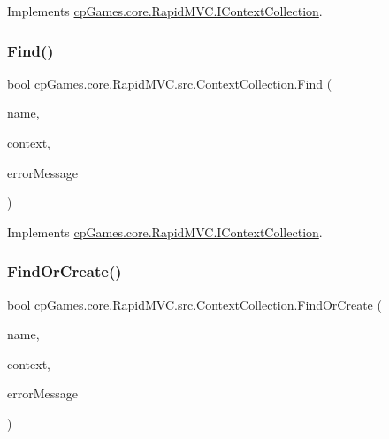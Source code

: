 Implements \mbox{\hyperlink{interfacecp_games_1_1core_1_1_rapid_m_v_c_1_1_i_context_collection_a341363d37ac179e4b157d97f6e69404f}{cp\+Games.\+core.\+Rapid\+M\+V\+C.\+I\+Context\+Collection}}.

\mbox{\label{classcp_games_1_1core_1_1_rapid_m_v_c_1_1src_1_1_context_collection_a02fb5263a77b5b36b5f3e32a98686b12}} 
\subsubsection{\texorpdfstring{Find()}{Find()}}
{\footnotesize\ttfamily bool cp\+Games.\+core.\+Rapid\+M\+V\+C.\+src.\+Context\+Collection.\+Find (\begin{DoxyParamCaption}\item[{string}]{name,  }\item[{out \mbox{\hyperlink{interfacecp_games_1_1core_1_1_rapid_m_v_c_1_1_i_context}{I\+Context}}}]{context,  }\item[{out string}]{error\+Message }\end{DoxyParamCaption})}



Implements \mbox{\hyperlink{interfacecp_games_1_1core_1_1_rapid_m_v_c_1_1_i_context_collection_a69e776a5c412ae0659e9df5e208ec374}{cp\+Games.\+core.\+Rapid\+M\+V\+C.\+I\+Context\+Collection}}.

\mbox{\label{classcp_games_1_1core_1_1_rapid_m_v_c_1_1src_1_1_context_collection_ad7d4663f1d96310bfba100e9140b11b8}} 
\subsubsection{\texorpdfstring{FindOrCreate()}{FindOrCreate()}}
{\footnotesize\ttfamily bool cp\+Games.\+core.\+Rapid\+M\+V\+C.\+src.\+Context\+Collection.\+Find\+Or\+Create (\begin{DoxyParamCaption}\item[{string}]{name,  }\item[{out \mbox{\hyperlink{interfacecp_games_1_1core_1_1_rapid_m_v_c_1_1_i_context}{I\+Context}}}]{context,  }\item[{out string}]{error\+Message }\end{DoxyParamCaption})}



